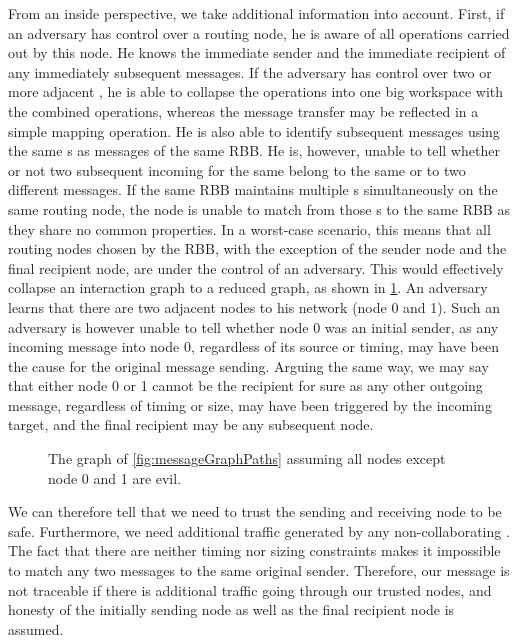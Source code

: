 From an inside perspective, we take additional information into account. First, if an adversary has control over a routing node, he is aware of all operations carried out by this node. He knows the immediate sender and the immediate recipient of any immediately subsequent messages. If the adversary has control over two or more adjacent \VortexNodes{}, he is able to collapse the operations into one big workspace with the combined operations, whereas the message transfer may be reflected in a simple mapping operation. He is also able to identify subsequent messages using the same s as messages of the same RBB. He is, however, unable to tell whether or not two subsequent incoming \VortexMessages{} for the same  belong to the same or to two different messages. If the same RBB maintains multiple s simultaneously on the same routing node, the node is unable to match from those s to the same RBB as they share no common properties. In a worst-case scenario, this means that all routing nodes chosen by the RBB, with the exception of the sender node and the final recipient node,  are under the control of an adversary. This would effectively collapse an interaction graph to a reduced graph, as shown in \cref{fig:reducedMessageGraphPaths}. An adversary learns that there are two adjacent nodes to his network (node 0 and 1). Such an adversary is however unable to tell whether node 0 was an initial sender, as any incoming message into node 0, regardless of its source or timing, may have been the cause for the original message sending. Arguing the same way, we may say that either node 0 or 1 cannot be the recipient for sure as any other outgoing message, regardless of timing or size, may have been triggered by the incoming target, and the final recipient may be any subsequent node.

\begin{figure}[!t]\centering
	\resizebox{.9\linewidth}{!}{
		
	}
	\caption{The graph of \ref{fig:messageGraphPaths} assuming all nodes except node 0 and 1 are evil.}
	\label{fig:reducedMessageGraphPaths}
\end{figure}

We can therefore tell that we need to trust the sending and receiving node to be safe. Furthermore, we need additional traffic generated by any non-collaborating \VortexNode{}. The fact that there are neither timing nor sizing constraints makes it impossible to match any two messages to the same original sender. Therefore, our message is not traceable if there is additional traffic going through our trusted nodes, and honesty of the initially sending node as well as the final recipient node is assumed.

